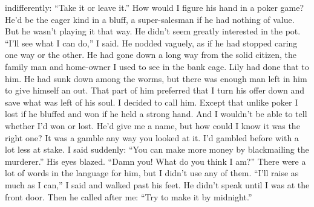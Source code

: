 \documentclass{novel}
\begin{document}
indifferently: “Take it or leave it.” How would I figure his hand in a poker game? He’d be the eager kind in a bluff, a super-salesman if he had nothing of value. But he wasn’t playing it that way. He didn’t seem greatly interested in the pot. “I’ll see what I can do,” I said. He nodded vaguely, as if he had stopped caring one way or the other. He had gone down a long way from the solid citizen, the family man and home-owner I used to see in the bank cage. Lily had done that to him. He had sunk down among the worms, but there was enough man left in him to give himself an out. That part of him preferred that I turn his offer down and save what was left of his soul. I decided to call him. Except that unlike poker I lost if he bluffed and won if he held a strong hand. And I wouldn’t be able to tell whether I’d won or lost. He’d give me a name, but how could I know it was the right one? It was a gamble any way you looked at it. I’d gambled before with a lot less at stake. I said suddenly: “You can make more money by blackmailing the murderer.” His eyes blazed. “Damn you! What do you think I am?” There were a lot of words in the language for him, but I didn’t use any of them. “I’ll raise as much as I can,” I said and walked past his feet. He didn’t speak until I was at the front door. Then he called after me: “Try to make it by midnight.”


\begin{ChapterStart}

\vspace{3\nbs}
\end{ChapterStart}

\end{document}
